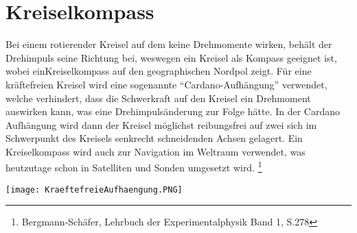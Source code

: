 

\section{Kreiselkompass}
Bei einem rotierender Kreisel auf dem keine Drehmomente wirken, behält der Drehimpuls seine Richtung bei, weswegen ein Kreisel als Kompass geeignet ist, wobei einKreiselkompass auf den geographischen Nordpol zeigt. Für eine kräftefreien Kreisel wird eine sogenannte \enquote{Cardano-Aufhängung} verwendet, welche verhindert, dass die Schwerkraft auf den Kreisel ein Drehmoment auswirken kann, was eine Drehimpulsänderung zur Folge hätte. In der Cardano Aufhängung wird dann der Kreisel möglichst reibungsfrei auf zwei sich im Schwerpunkt des Kreisels senkrecht schneidenden Achsen gelagert. Ein Kreiselkompass wird auch zur Navigation im Weltraum verwendet, was heutzutage schon in Satelliten und Sonden umgesetzt wird. \footnote{Bergmann-Schäfer, Lehrbuch der Experimentalphysik Band 1, S.278}
\begin{center}
    \texttt{[image: KraeftefreieAufhaengung.PNG]}
\end{center}